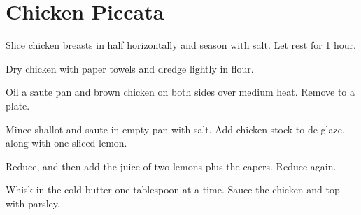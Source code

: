 \section{Chicken Piccata}
\begin{recipe}


Slice chicken breasts in half horizontally and season with salt. Let rest for 1 hour.


Dry chicken with paper towels and dredge lightly in flour. 

Oil a saute pan and brown chicken on both sides over medium heat. Remove to a plate. 


Mince shallot and saute in empty pan with salt. Add chicken stock to de-glaze, along with one sliced lemon.

Reduce, and then add the juice of two lemons plus the capers. Reduce again. 


Whisk in the cold butter one tablespoon at a time. Sauce the chicken and top with parsley. 

\end{recipe}
